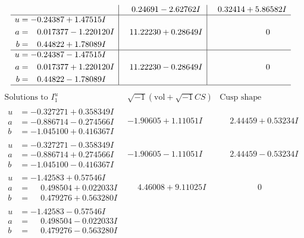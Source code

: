 \documentclass[1p]{elsarticle_modified}
\theoremstyle{definition}
\newcommand{\I}{\sqrt{-1}}
\begin{document}
$$\begin{array}{c|c|c}
 & \phantom{-}0.24691 - 2.62762 I & \phantom{-}0.32414 + 5.86582 I \\ \hline\begin{aligned}
u &= -0.24387 + 1.47515 I \\
a &= \phantom{-}0.017377 - 1.220120 I \\
b &= \phantom{-}0.44822 + 1.78089 I\end{aligned}
 & \phantom{-}11.22230 + 0.28649 I & \phantom{-0.000000 } 0 \\ \hline\begin{aligned}
u &= -0.24387 - 1.47515 I \\
a &= \phantom{-}0.017377 + 1.220120 I \\
b &= \phantom{-}0.44822 - 1.78089 I\end{aligned}
 & \phantom{-}11.22230 - 0.28649 I & \phantom{-0.000000 } 0\\
 \hline 
 \end{array}$$\newpage$$\begin{array}{c|c|c}  
\text{Solutions to }I^u_{1}& \I (\text{vol} + \sqrt{-1}CS) & \text{Cusp shape}\\
 \hline 
\begin{aligned}
u &= -0.327271 + 0.358349 I \\
a &= -0.886714 - 0.274566 I \\
b &= -1.045100 + 0.416367 I\end{aligned}
 & -1.90605 + 1.11051 I & \phantom{-}2.44459 + 0.53234 I \\ \hline\begin{aligned}
u &= -0.327271 - 0.358349 I \\
a &= -0.886714 + 0.274566 I \\
b &= -1.045100 - 0.416367 I\end{aligned}
 & -1.90605 - 1.11051 I & \phantom{-}2.44459 - 0.53234 I \\ \hline\begin{aligned}
u &= -1.42583 + 0.57546 I \\
a &= \phantom{-}0.498504 + 0.022033 I \\
b &= \phantom{-}0.479276 + 0.563280 I\end{aligned}
 & \phantom{-}4.46008 + 9.11025 I & \phantom{-0.000000 } 0 \\ \hline\begin{aligned}
u &= -1.42583 - 0.57546 I \\
a &= \phantom{-}0.498504 - 0.022033 I \\
b &= \phantom{-}0.479276 - 0.563280 I\end{aligned}

\end{array}$$
\end{document}
